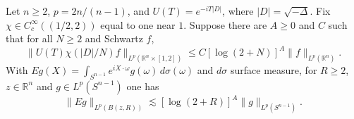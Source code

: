 Let \(n\ge2\), \(p=2n/(n-1)\), and \(U(T)=e^{-iT|D|}\), where \(|D|=\sqrt{-\Delta}\). Fix \(\chi\in C^\infty_c((1/2,2))\) equal to one near \(1\). Suppose there are \(A\ge0\) and \(C\) such that for all \(N\ge2\) and Schwartz \(f\),
\[
 \|U(T)\chi(|D|/N)f\|_{L^p(\mathbb R^n\times[1,2])}
 \le C[\log(2+N)]^{A}\|f\|_{L^p(\mathbb R^n)}.
\]
With \(Eg(X)=\int_{S^{n-1}}e^{iX\cdot\omega}g(\omega)\,d\sigma(\omega)\) and \(d\sigma\) surface measure, for \(R\ge2\), \(z\in\mathbb R^n\) and \(g\in L^p(S^{n-1})\) one has
\[
 \|Eg\|_{L^p(B(z,R))}\lesssim [\log(2+R)]^A\|g\|_{L^p(S^{n-1})}.
\]
